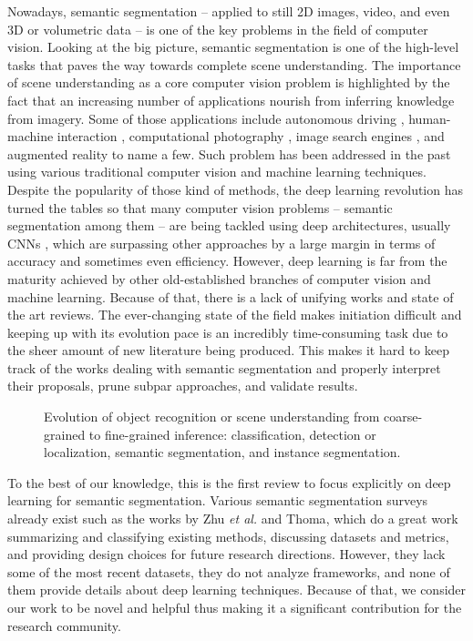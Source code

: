 Nowadays, semantic segmentation -- applied to still 2D images, video, and even 3D or volumetric data -- is one of the key problems in the field of computer vision. Looking at the big picture, semantic segmentation is one of the high-level tasks that paves the way towards complete scene understanding. The importance of scene understanding as a core computer vision problem is highlighted by the fact that an increasing number of applications nourish from inferring knowledge from imagery. Some of those applications include autonomous driving \cite{Ess2009}\cite{Geiger2012}\cite{Cordts2016}, human-machine interaction \cite{Oberweger2015}, computational photography \cite{Yoon2015}, image search engines \cite{Wan2014}, and augmented reality to name a few. Such problem has been addressed in the past using various traditional computer vision and machine learning techniques. Despite the popularity of those kind of methods, the deep learning revolution has turned the tables so that many computer vision problems -- semantic segmentation among them -- are being tackled using deep architectures, usually \acp{CNN} \cite{Ning2005}\cite{Ciresan2012}\cite{Farabet2013}\cite{Hariharan2014}\cite{Gupta2014}, which are surpassing other approaches by a large margin in terms of accuracy and sometimes even efficiency. However, deep learning is far from the maturity achieved by other old-established branches of computer vision and machine learning. Because of that, there is a lack of unifying works and state of the art reviews. The ever-changing state of the field makes initiation difficult and keeping up with its evolution pace is an incredibly time-consuming task due to the sheer amount of new literature being produced. This makes it hard to keep track of the works dealing with semantic segmentation and properly interpret their proposals, prune subpar approaches, and validate results.

\begin{figure}[!b]
	\centering
	\caption{Evolution of object recognition or scene understanding from coarse-grained to fine-grained inference: classification, detection or localization, semantic segmentation, and instance segmentation.}
	\label{fig:background_evolution}
\end{figure}

To the best of our knowledge, this is the first review to focus explicitly on deep learning for semantic segmentation. Various semantic segmentation surveys already exist such as the works by Zhu \emph{et al.}\cite{Zhu2016} and Thoma\cite{Thoma2016}, which do a great work summarizing and classifying existing methods, discussing datasets and metrics, and providing design choices for future research directions. However, they lack some of the most recent datasets, they do not analyze frameworks, and none of them provide details about deep learning techniques. Because of that, we consider our work to be novel and helpful thus making it a significant contribution for the research community.

